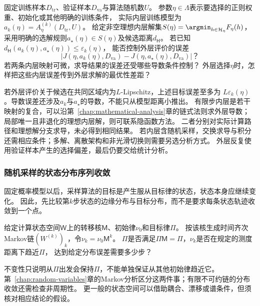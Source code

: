 \begin{mathproblem}[内层求解误差对外层目标与导数的影响]
  \label{question:future-nested-learning}
  固定训练样本$D_{\mathrm{tr}}$、验证样本$D_{\mathrm{va}}$与算法随机数$U$。
  参数$\eta\in\Lambda$表示要选择的正则权重、初始化或其他明确的训练条件，
  实际内层训练模型为$a_k(\eta)=A_\eta^{(k)}(D_{\mathrm{tr}},U)$。
  给定非空理想内层解集$S(\eta)=\argmin_{h\in\mathcal H_\eta}F_\eta(h)$，
  采用明确的选解规则$a_\star(\eta)\in S(\eta)$及候选距离$d_{\mathsf H}$。
  若已知$d_{\mathsf H}(a_k(\eta),a_\star(\eta))\leq\varepsilon_k(\eta)$，
  能否控制外层评价的误差
  \[
    \left|J(\eta,a_k(\eta),D_{\mathrm{va}})
          -J(\eta,a_\star(\eta),D_{\mathrm{va}})\right|\text{？}
  \]
  若两条内层映射可微，求导结果的误差还受哪些导数条件控制？
  外层选择$\eta$时，怎样把这些内层误差传到外层求解的最优性差距？
\end{mathproblem}

若外层评价关于候选在共同区域内为$L$-Lipschitz，上述目标误差至多为
$L\varepsilon_k(\eta)$。导数误差还涉及$a_k$与$a_\star$的导数，不能只从模型距离小推出。
有限步内层是若干映射的复合，可以沿第~\ref{chap:mathematical-analysis}章的链式法则求外层导数；
局部唯一且非退化的理想内层解，则可联系隐函数方法。
二者分别对实际计算路径和理想解分支求导，未必得到相同结果。
若内层含随机采样，交换求导与积分还需相应条件；多解、离散架构和非光滑切换则需要另选分析方式。
外层反复使用验证样本产生的选择偏差，最后仍要交给统计分析。

\subsubsection{随机采样的状态分布序列收敛}
\label{sec:future-analysis-sampling-dynamics}

固定概率模型以后，采样算法的目标是产生服从目标律的状态，状态本身应继续变化。
因此，先比较第$k$步状态的边缘分布与目标分布，而不是要求每条状态轨迹收敛到一个点。

\begin{mathproblem}[采样状态分布是否趋近目标分布]
  \label{question:future-sampling-dynamics}
  给定计算状态空间$\mathsf W$上的转移核$\mathsf M$、初始律$\nu_0$和目标律$\Pi$。
  按该核生成时间齐次Markov链$(W^{(k)})_k$，令$\nu_k=\nu_0\mathsf M^k$。
  $\Pi$是否满足$\Pi\mathsf M=\Pi$，$\nu_k$是否在规定的测度距离下趋近$\Pi$，
  达到给定分布误差需要多少步？
\end{mathproblem}

不变性只说明从$\Pi$出发会保持$\Pi$，不能单独保证从其他初始律趋近它。
第~\ref{chap:random-variables}章的Markov分析区分这两件事；有限不可约链的分布收敛还需检查非周期性。
更一般的状态空间可以借助耦合、漂移或谱条件，但须核对相应结论的假设。

